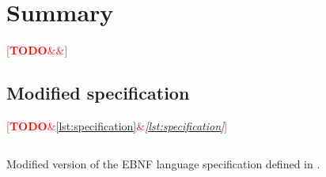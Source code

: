 \documentclass[english,engineering]{wizthesis}
\newcommand{\todo}[1]{%
  \textcolor{red}{[\textbf{TODO}\ifx&#1&{}\else{ }\fi\emph{#1}]}%
}
\begin{document}
\chapter{Summary}

\todo{}



\listoffigures

\listoftables

\listoflistings

\begin{appendices}

\chapter{Modified specification} \label{ch:modified-spec}

\todo{\ref{lst:specification}}

\begin{listing}[H]
  \inputminted[fontsize=\small,frame=lines,breaklines,linenos]
    {lexers/ebnf_lexer.py:EbnfLexer -x}{listings/specification.ebnf}
  \caption{Modified version of the EBNF language specification defined in
  \cite{iso-14977}.}
  \label{lst:specification}
\end{listing}

\end{appendices}
\end{document}

